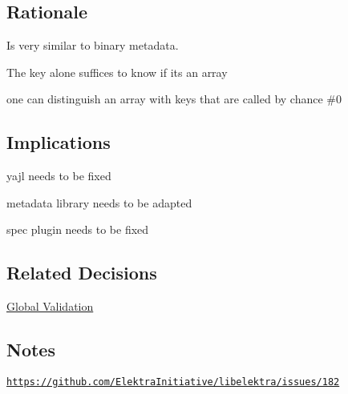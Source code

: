 

\subsection*{Rationale}


\begin{DoxyItemize}
\item Is very similar to {\ttfamily binary} metadata.
\item The key alone suffices to know if its an array
\item one can distinguish an array with keys that are called by chance \#0
\end{DoxyItemize}

\subsection*{Implications}


\begin{DoxyItemize}
\item yajl needs to be fixed
\item metadata library needs to be adapted
\item spec plugin needs to be fixed
\end{DoxyItemize}

\subsection*{Related Decisions}


\begin{DoxyItemize}
\item \hyperlink{doc_decisions_global_validation_md}{Global Validation}
\end{DoxyItemize}

\subsection*{Notes}

\href{https://github.com/ElektraInitiative/libelektra/issues/182}{\tt https\+://github.\+com/\+Elektra\+Initiative/libelektra/issues/182} 